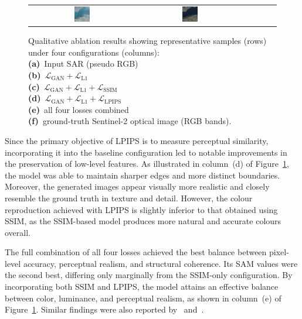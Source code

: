 \begin{figure}[h!]
\begin{tabular}{*{6}{c}}
        \includegraphics[width=0.155\textwidth]{img/ablation/sample_4/all.png}   &
        \includegraphics[width=0.155\textwidth]{img/ablation/sample_4/gt.png}                                  \\
    \end{tabular}

    \caption[Qualitative ablation study across loss configurations]{%
    Qualitative ablation results showing representative samples (rows) under four configurations (columns):\\
    \textbf{(a)}~Input SAR (pseudo RGB)\\
    \textbf{(b)}~$\mathcal{L}_{\text{GAN}}{+}\mathcal{L}_{\text{L1}}$\\
    \textbf{(c)}~$\mathcal{L}_{\text{GAN}}{+}\mathcal{L}_{\text{L1}}{+}\mathcal{L}_{\text{SSIM}}$\\
    \textbf{(d)}~$\mathcal{L}_{\text{GAN}}{+}\mathcal{L}_{\text{L1}}{+}\mathcal{L}_{\text{LPIPS}}$\\
    \textbf{(e)}~all four losses combined\\
    \textbf{(f)}~ground-truth Sentinel-2 optical image (RGB bands).
    }
    \label{fig:ablation_samples}
\end{figure}

Since the primary objective of LPIPS is to measure perceptual similarity, incorporating it into the baseline configuration led to notable improvements in the preservation of low-level features. As illustrated in column~(d) of Figure~\ref{fig:ablation_samples}, the model was able to maintain sharper edges and more distinct boundaries. Moreover, the generated images appear visually more realistic and closely resemble the ground truth in texture and detail. However, the colour reproduction achieved with LPIPS is slightly inferior to that obtained using SSIM, as the SSIM-based model produces more natural and accurate colours overall.

The full combination of all four losses achieved the best balance between pixel-level accuracy, perceptual realism, and structural coherence. 
Its SAM values were the second best, differing only marginally from the SSIM-only configuration. 
By incorporating both SSIM and LPIPS, the model attains an effective balance between color, luminance, and perceptual realism, as shown in column~(e) of Figure~\ref{fig:ablation_samples}. 
Similar findings were also reported by~\cite{s2o_ViT_cGAN} and~\cite{CR_RS_GAN_s2o}. 
 
